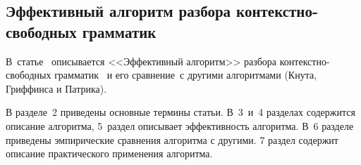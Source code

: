 \subsection{Эффективный алгоритм разбора контекстно-свободных грамматик} \label{subsection_earley1970}
В~статье~\cite{Earley1970} описывается <<Эффективный алгоритм>> разбора контекстно-свободных грамматик ~и его сравнение~с другими алгоритмами (Кнута, Гриффинса и Патрика).

В разделе~2 приведены основные термины статьи. В~3~и~4 разделах содержится описание алгоритма, 5~раздел описывает эффективность алгоритма. В~6 разделе приведены эмпирические сравнения алгоритма с другими. 7 раздел содержит описание практического применения алгоритма.

